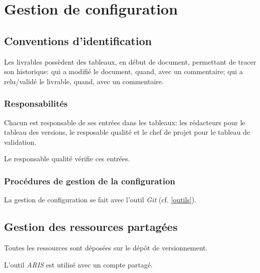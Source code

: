 \section{Gestion de configuration}

\subsection{Conventions d'identification}
Les livrables possèdent des tableaux, en début de document, permettant
de tracer son historique: qui a modifié le document, quand, avec un
commentaire; qui a relu/validé le livrable, quand, avec un commentaire.

\subsubsection{Responsabilités}
Chacun est responsable de ses entrées dans les tableaux: les rédacteurs
pour le tableau des versions, le resposable qualité et le chef de projet
pour le tableau de validation.

Le responsable qualité vérifie ces entrées.

\subsubsection{Procédures de gestion de la configuration}
La gestion de configuration se fait avec l'outil \textsl{Git} (cf. \ref{outils}).

\subsection{Gestion des ressources partagées}
Toutes les ressources sont déposées sur le dépôt de versionnement.

L'outil \textsl{ARIS} est utilisé avec un compte partagé.
